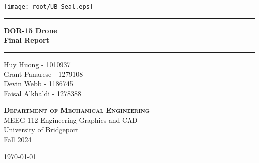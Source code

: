 
\begin{titlepage}
\begin{center}
\vspace{1 cm}
\texttt{[image: root/UB-Seal.eps]}~\\[1 cm]
\vspace{1 cm}

\hrule
\vspace{.5 cm}
{ \huge \bfseries DOR-15 Drone}
\vspace{.5 cm}
\\{\huge \bfseries Final Report} %
\vspace{.5 cm}

\hrule
\vspace{1 cm}
\centering

Huy Huong - 1010937\\
Grant Panarese - 1279108\\
Devin Webb - 1186745\\
Faisal Alkhaldi - 1278388\\


\vspace{.5 cm}

\textsc{\textbf{Department of Mechanical Engineering}}\\
\centering
    MEEG-112 Engineering Graphics and CAD \\
    University of Bridgeport \\
    Fall 2024 \\

\vspace{1 cm}

\centering \today %
\end{center}
\end{titlepage}